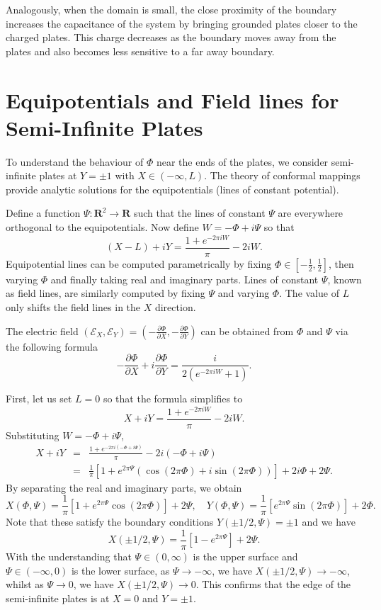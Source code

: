\documentclass{article}
\newcommand{\pder}[2][]{\frac{\partial#1}{\partial#2}}
\begin{document}
Analogously, when the domain is small, the close proximity of the boundary increases the capacitance of the system by bringing grounded plates closer to the charged plates. This charge decreases as the boundary moves away from the plates and also becomes less sensitive to a far away boundary.

\section{Equipotentials and Field lines for Semi-Infinite Plates}

To understand the behaviour of \(\Phi\) near the ends of the plates, we consider semi-infinite plates at \(Y =\pm 1\) with \(X \in (-\infty, L)\). The theory of conformal mappings provide analytic solutions for the equipotentials (lines of constant potential).

Define a function \(\Psi: \mathbf{R}^2 \to \mathbf{R}\) such that the lines of constant \(\Psi\) are everywhere orthogonal to the equipotentials. Now define \(W = -\Phi + i\Psi\) so that
\[ (X-L) + iY = \frac{1+e^{-2\pi iW}}{\pi} - 2iW. \] 
Equipotential lines can be computed parametrically by fixing \(\Phi \in  [-\frac{1}{2}, \frac{1}{2}]\), then varying \(\Phi\) and finally taking real and imaginary parts. Lines of constant \(\Psi\), known as field lines, are similarly computed by fixing \(\Psi\) and varying \(\Phi\). The value of \(L\) only shifts the field lines in the \(X\) direction.

The electric field \((\mathcal{E}_X, \mathcal{E}_Y) = (-\pder[\Phi]{X}, -\pder[\Phi]{Y})\) can be obtained from \(\Phi\) and \(\Psi\) via the following formula
\[ -\pder[\Phi]{X} + i\pder[\Phi]{Y} = \frac{i}{2(e^{-2\pi iW} + 1)}. \]

First, let us set \(L = 0\) so that the formula simplifies to
\[ X + iY = \frac{1+e^{-2\pi iW}}{\pi} - 2iW. \]
Substituting \(W = -\Phi + i\Psi\),
\begin{eqnarray*}
    X + iY & = & \frac{1+e^{-2\pi i(-\Phi + i\Psi)}}{\pi} - 2i(-\Phi + i\Psi) \\
           & = & \frac{1}{\pi}[1+e^{2\pi\Psi}(\cos(2\pi\Phi) + i\sin(2\pi\Phi))] + 2i\Phi + 2\Psi. 
\end{eqnarray*}
By separating the real and imaginary parts, we obtain
\[ X(\Phi, \Psi) = \frac{1}{\pi}[1 + e^{2\pi\Psi}\cos(2\pi\Phi)] + 2\Psi, \quad Y(\Phi, \Psi) = \frac{1}{\pi}[e^{2\pi\Psi}\sin(2\pi\Phi)] + 2\Phi. \]
Note that these satisfy the boundary conditions \(Y(\pm1/2, \Psi) = \pm1\) and we have 
\[ X(\pm 1/2, \Psi) = \frac{1}{\pi}[1-e^{2\pi \Psi}] + 2\Psi. \]
With the understanding that \(\Psi \in (0, \infty)\) is the upper surface and \(\Psi \in (-\infty, 0)\) is the lower surface, as \(\Psi \to -\infty\), we have \(X(\pm 1/2, \Psi) \to -\infty\), whilst as \(\Psi \to 0\), we have \(X(\pm 1/2, \Psi) \to 0\). This confirms that the edge of the semi-infinite plates is at \(X = 0\) and \(Y = \pm 1\).
\end{document}
